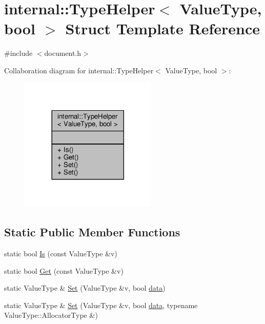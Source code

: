 \hypertarget{structinternal_1_1TypeHelper_3_01ValueType_00_01bool_01_4}{}\section{internal\+:\+:Type\+Helper$<$ Value\+Type, bool $>$ Struct Template Reference}
\label{structinternal_1_1TypeHelper_3_01ValueType_00_01bool_01_4}


{\ttfamily \#include $<$document.\+h$>$}



Collaboration diagram for internal\+:\+:Type\+Helper$<$ Value\+Type, bool $>$\+:
\nopagebreak
\begin{figure}[H]
\begin{center}
\leavevmode
\includegraphics[width=185pt]{structinternal_1_1TypeHelper_3_01ValueType_00_01bool_01_4__coll__graph}
\end{center}
\end{figure}
\subsection*{Static Public Member Functions}
\begin{DoxyCompactItemize}
\item 
static bool \hyperlink{structinternal_1_1TypeHelper_3_01ValueType_00_01bool_01_4_aa73fb8b4ed649706f7f9165401f89c27}{Is} (const Value\+Type \&v)
\item 
static bool \hyperlink{structinternal_1_1TypeHelper_3_01ValueType_00_01bool_01_4_aed612b233e5985d049248b414fb0034a}{Get} (const Value\+Type \&v)
\item 
static Value\+Type \& \hyperlink{structinternal_1_1TypeHelper_3_01ValueType_00_01bool_01_4_a4bfa644e57e7d725468ed78103c1579a}{Set} (Value\+Type \&v, bool \hyperlink{imgui__impl__opengl3__loader_8h_abd87654504355b4c1bb002dcb1d4d16a}{data})
\item 
static Value\+Type \& \hyperlink{structinternal_1_1TypeHelper_3_01ValueType_00_01bool_01_4_a01a2bdf4117fb767c8d703be9e0f5f1d}{Set} (Value\+Type \&v, bool \hyperlink{imgui__impl__opengl3__loader_8h_abd87654504355b4c1bb002dcb1d4d16a}{data}, typename Value\+Type\+::\+Allocator\+Type \&)
\end{DoxyCompactItemize}


